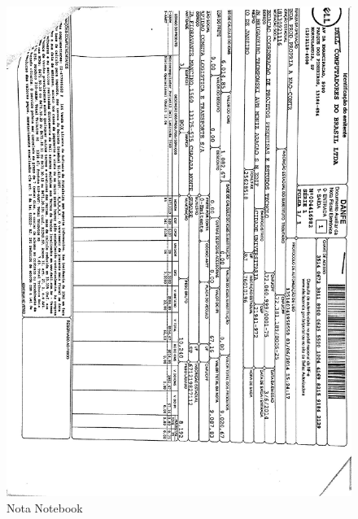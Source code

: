 \begin{figure}[h!]
 \centering
 \includegraphics[width=1\columnwidth]{Notebook/nota_notebook.pdf}
 \caption{Nota Notebook}
 \end{figure}
